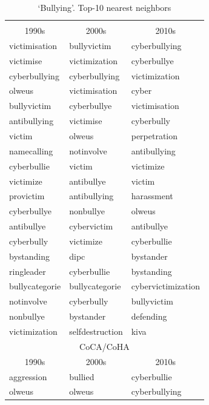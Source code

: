 \documentclass[output=paper]{langsci/langscibook}
\begin{document}
\begin{table}
\footnotesize
\caption{`Bullying'. Top-10 nearest neighbors\label{tab:bullying-nns}}
 \begin{tabular}{lll}
  \lsptoprule
  \multicolumn{3}{c}{Psychology}\\
 \multicolumn{1}{c}{1990s}  & \multicolumn{1}{c}{2000s} & \multicolumn{1}{c}{2010s}\\\midrule
victimisation&bullyvictim&cyberbullying         \\  
victimise&victimization&cyberbullye             \\  
cyberbullying&cyberbullying&victimization       \\  
olweus&victimisation&cyber                      \\  
bullyvictim&cyberbullye&victimisation           \\  
antibullying&victimise&cyberbully               \\  
victim&olweus&perpetration                      \\  
namecalling&notinvolve&antibullying             \\  
cyberbullie&victim&victimize                    \\  
victimize&antibullye&victim                     \\  
provictim&antibullying&harassment               \\  
cyberbullye&nonbullye&olweus                    \\  
antibullye&cybervictim&antibullye               \\  
cyberbully&victimize&cyberbullie                \\  
bystanding&dipc&bystander                       \\  
ringleader&cyberbullie&bystanding               \\  
bullycategorie&bullycategorie&cybervictimization\\  
notinvolve&cyberbully&bullyvictim               \\  
nonbullye&bystander&defending                   \\  
victimization&selfdestruction&kiva              \\ \midrule
\multicolumn{3}{c}{CoCA/CoHA}\\
\multicolumn{1}{c}{1990s}  & \multicolumn{1}{c}{2000s} & \multicolumn{1}{c}{2010s}\\\midrule
aggression&bullied&cyberbullie\\
olweus&olweus&cyberbullying\\

\end{tabular}
\end{table}
\end{document}
